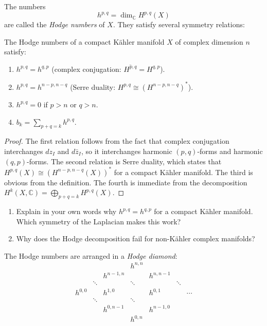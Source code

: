 The numbers
\[
h^{p,q} = \dim_{\mathbb{C}} H^{p,q}(X)
\]
are called the \emph{Hodge numbers} of $X$. They satisfy several symmetry relations:

\begin{proposition}
The Hodge numbers of a compact K\"{a}hler manifold $X$ of complex dimension $n$ satisfy:
\begin{enumerate}
\item $h^{p,q} = h^{q,p}$ (complex conjugation: $\overline{H^{p,q}} = H^{q,p}$).
\item $h^{p,q} = h^{n-p, n-q}$ (Serre duality: $H^{p,q} \cong (H^{n-p, n-q})^*$).
\item $h^{p,q} = 0$ if $p > n$ or $q > n$.
\item $b_k = \sum_{p+q=k} h^{p,q}$.
\end{enumerate}
\end{proposition}

\begin{proof}
The first relation follows from the fact that complex conjugation interchanges $dz_I$ and $d\bar{z}_I$, so it interchanges harmonic $(p,q)$-forms and harmonic $(q,p)$-forms. The second relation is Serre duality, which states that $H^{p,q}(X) \cong (H^{n-p, n-q}(X))^*$ for a compact K\"{a}hler manifold. The third is obvious from the definition. The fourth is immediate from the decomposition $H^k(X, \mathbb{C}) = \bigoplus_{p+q=k} H^{p,q}(X)$.
\end{proof}

\begin{checkyou}
\begin{enumerate}
\item Explain in your own words why $h^{p,q} = h^{q,p}$ for a compact K\"{a}hler manifold. Which symmetry of the Laplacian makes this work?
\item Why does the Hodge decomposition fail for non-K\"{a}hler complex manifolds?
\end{enumerate}
\end{checkyou}

The Hodge numbers are arranged in a \emph{Hodge diamond}:
\[
\begin{array}{ccccccc}
 & & & h^{n,n} & & & \\
 & & h^{n-1,n} & & h^{n,n-1} & & \\
 & \ddots & & \ddots & & \ddots & \\
h^{0,0} & & h^{1,0} & & h^{0,1} & & \cdots \\
 & \ddots & & \ddots & & & \\
 & & h^{0,n-1} & & h^{n-1,0} & & \\
 & & & h^{0,n} & & &
\end{array}
\]

